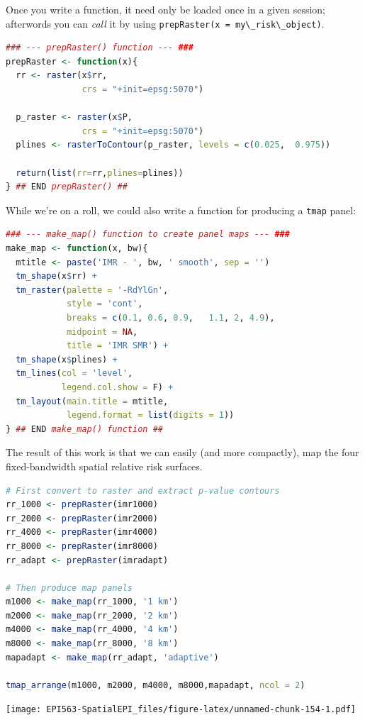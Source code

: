 \documentclass[
]{book}
\newcommand{\passthrough}[1]{#1}
\begin{document}
Once you write a function, it need only be loaded once in a given session; afterwords you can \emph{call} it by using \passthrough{\lstinline!prepRaster(x = my\_risk\_object)!}.

\begin{lstlisting}[language=R]
### --- prepRaster() function --- ###
prepRaster <- function(x){
  rr <- raster(x$rr,
               crs = "+init=epsg:5070")

  p_raster <- raster(x$P,
               crs = "+init=epsg:5070")
  plines <- rasterToContour(p_raster, levels = c(0.025,  0.975))
  
  return(list(rr=rr,plines=plines))
} ## END prepRaster() ##
\end{lstlisting}

While we're on a roll, we could also write a function for producing a \passthrough{\lstinline!tmap!} panel:

\begin{lstlisting}[language=R]
### --- make_map() function to create panel maps --- ###
make_map <- function(x, bw){
  mtitle <- paste('IMR - ', bw, ' smooth', sep = '')
  tm_shape(x$rr) +
  tm_raster(palette = '-RdYlGn',
            style = 'cont',
            breaks = c(0.1, 0.6, 0.9,   1.1, 2, 4.9),
            midpoint = NA,
            title = 'IMR SMR') +
  tm_shape(x$plines) +
  tm_lines(col = 'level',
           legend.col.show = F) + 
  tm_layout(main.title = mtitle,
            legend.format = list(digits = 1)) 
} ## END make_map() function ##
\end{lstlisting}

The result of this work is that we can easily (and more compactly), map the four fixed-bandwidth spatial relative risk surfaces.

\begin{lstlisting}[language=R]
# First convert to raster and extract p-value contours
rr_1000 <- prepRaster(imr1000)
rr_2000 <- prepRaster(imr2000)
rr_4000 <- prepRaster(imr4000)
rr_8000 <- prepRaster(imr8000)
rr_adapt <- prepRaster(imradapt)

# Then produce map panels
m1000 <- make_map(rr_1000, '1 km')
m2000 <- make_map(rr_2000, '2 km')
m4000 <- make_map(rr_4000, '4 km')
m8000 <- make_map(rr_8000, '8 km')
mapadapt <- make_map(rr_adapt, 'adaptive')

tmap_arrange(m1000, m2000, m4000, m8000,mapadapt, ncol = 2)
\end{lstlisting}

\texttt{[image: EPI563-SpatialEPI\_files/figure-latex/unnamed-chunk-154-1.pdf]}
\end{document}
